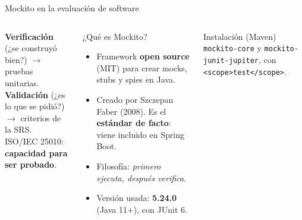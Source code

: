 \documentclass[aspectratio=169,10pt]{beamer}
\newcommand{\code}[1]{\texttt{#1}}
\begin{document}
\begin{frame}{Mockito en la evaluación de software}
\begin{columns}[T]
\centering
{}

\vspace{0.2cm}
\scriptsize \textbf{Verificación} (¿se construyó bien?) $\rightarrow$ pruebas unitarias.\\
\textbf{Validación} (¿es lo que se pidió?) $\rightarrow$ criterios de la SRS.\\
ISO/IEC 25010: \textbf{capacidad para ser probado}.
\begin{block}{¿Qué es Mockito?}
\scriptsize
\begin{itemize}
  \item Framework \textbf{open source} (MIT) para crear mocks, stubs y spies en Java.
  \item Creado por Szczepan Faber (2008). Es el \textbf{estándar de facto}: viene incluido en Spring Boot.
  \item Filosofía: \emph{primero ejecuta, después verifica}.
  \item Versión usada: \textbf{5.24.0} (Java 11+), con JUnit 6.
\end{itemize}
\end{block}
\begin{block}{Instalación (Maven)}
\scriptsize \code{mockito-core} y \code{mockito-junit-jupiter}, con \code{<scope>test</scope>}.
\end{block}
\end{columns}
\end{frame}
\end{document}

